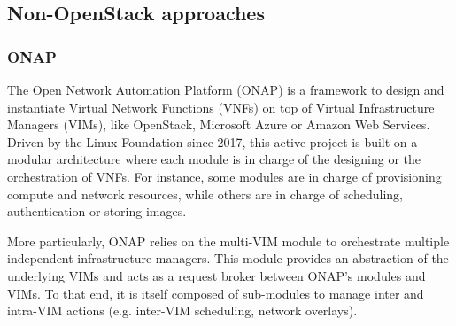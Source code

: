 
\subsection{Non-OpenStack approaches}
\label{subsec:non-os}

\subsubsection{ONAP}

The Open Network Automation Platform (ONAP) \cite{web:onap} is a framework to
design and instantiate Virtual Network Functions (VNFs) on top of Virtual
Infrastructure Managers (VIMs), like OpenStack, Microsoft Azure or Amazon Web
Services. Driven by the Linux Foundation since 2017, this active project is
built on a modular architecture where each module is in charge of the designing
or the orchestration of VNFs. For instance, some modules are in charge of
provisioning compute and network resources, while others are in charge of
scheduling, authentication or storing images.

%
%

More particularly, ONAP relies on the multi-VIM module to orchestrate multiple
independent infrastructure managers. This module provides an abstraction of the
underlying VIMs and acts as a request broker between ONAP's modules and VIMs. To
that end, it is itself composed of sub-modules to manage inter and intra-VIM
actions (e.g. inter-VIM scheduling, network overlays).

